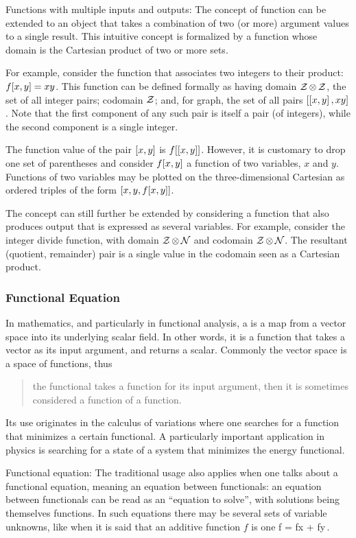 Functions with multiple inputs and outputs: The concept of function can be extended to an object that takes a combination of two (or more) argument values to a single result. This intuitive concept is formalized by a function whose domain is the Cartesian product of two or more sets.

For example, consider the function that associates two integers to their product: $f\!\left[{x,y}\right] = xy$. This function can be defined formally as having domain $\mathcal{Z}\operatorname{\otimes}\mathcal{Z}$, the set of all integer pairs; codomain $\mathcal{Z}$; and, for graph, the set of all pairs $\left[{\left[{x,y}\right],xy}\right]$. Note that the first component of any such pair is itself a pair (of integers), while the second component is a single integer.

The function value of the pair $\left[{x,y}\right]$ is $f\!\left[{\left[{x,y}\right]}\right]$. However, it is customary to drop one set of parentheses and consider $f\!\left[{x,y}\right]$ a function of two variables, $x$ and $y$. Functions of two variables may be plotted on the three-dimensional Cartesian as ordered triples of the form $\left[{x,y,f\!\left[{x,y}\right]}\right]$.

The concept can still further be extended by considering a function that also produces output that is expressed as several variables. For example, consider the integer divide function, with domain $\mathcal{Z}\operatorname{\otimes}\mathcal{N}$ and codomain $\mathcal{Z}\operatorname{\otimes}\mathcal{N}$. The resultant (quotient, remainder) pair is a single value in the codomain seen as a Cartesian product.


\subsubsection{Functional Equation}
In mathematics, and particularly in functional analysis, a  is a map from a vector space into its underlying scalar field. In other words, it is a function that takes a vector as its input argument, and returns a scalar. Commonly the vector space is a space of functions, thus 
\begin{quote}
the functional takes a function for its input argument, then it is sometimes considered a function of a function. 
\end{quote}
Its use originates in the calculus of variations where one searches for a function that minimizes a certain functional. A particularly important application in physics is searching for a state of a system that minimizes the energy functional.

Functional equation: The traditional usage also applies when one talks about a functional equation, meaning an equation between functionals: an equation between functionals can be read as an ``equation to solve'', with solutions being themselves functions. In such equations there may be several sets of variable unknowns, like when it is said that an additive function $f$ is one 
\beq
f = f\vat x + f\vat y\,.
\eeq


